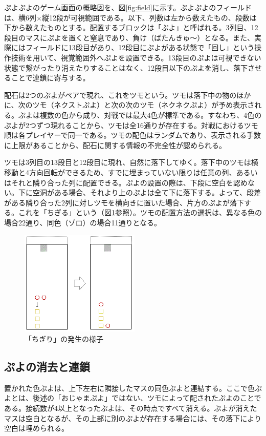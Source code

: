 \documentclass[12pt]{jsarticle}
\begin{document}
ぷよぷよのゲーム画面の概略図を、図\ref{fig:field}に示す。ぷよぷよのフィールドは、横6列$\times$縦12段が可視範囲である。以下、列数は左から数えたもの、段数は下から数えたものとする。配置するブロックは「ぷよ」と呼ばれる。3列目、12段目のマスにぷよを置くと窒息であり、負け（ばたんきゅ～）となる。また、実際にはフィールドに13段目があり、12段目にぷよがある状態で「回し」という操作技術を用いて、視覚範囲外へぷよを設置できる。13段目のぷよは可視できない状態で繋がったり消えたりすることはなく、12段目以下のぷよを消し、落下させることで連鎖に寄与する。

配石は2つのぷよがペアで現れ、これをツモという。ツモは落下中の物のほかに、次のツモ（ネクストぷよ）と次の次のツモ（ネクネクぷよ）が予め表示される。ぷよは複数の色から成り、対戦では最大4色が標準である。すなわち、4色のぷよが2つずつ現れることから、ツモは全16通りが存在する。対戦におけるツモ順は各プレイヤーで同一である。ツモの配色はランダムであり、表示される手数に上限があることから、配石に関する情報の不完全性が認められる。

ツモは3列目の13段目と12段目に現れ、自然に落下してゆく。落下中のツモは横移動と4方向回転ができるため、すでに埋まっていない限りは任意の列、あるいはそれと隣り合った列に配置できる。ぷよの設置の際は、下段に空白を認めない。下に空洞がある場合、それより上のぷよは全て下に落下する。よって、段差がある隣り合った2列に対しツモを横向きに置いた場合、片方のぷよが落下する。これを「ちぎる」という（図\ref{fig:tigiri}参照）。ツモの配置方法の選択は、異なる色の場合22通り、同色（ゾロ）の場合11通りとなる。
\begin{figure}[hbt]
  \begin{center}
  \includegraphics[height=5cm]{img/tigiri.png}
  \caption{「ちぎり」の発生の様子} \label{fig:tigiri}
\end{center}
\end{figure}

\subsection{ぷよの消去と連鎖} \label{del_chain}
置かれた色ぷよは、上下左右に隣接したマスの同色ぷよと連結する。ここで色ぷよとは、後述の「おじゃまぷよ」ではない、ツモによって配されたぷよのことである。接続数が4以上となったぷよは、その時点ですべて消える。ぷよが消えたマスは空白となるが、その上部に別のぷよが存在する場合には、その落下により空白は埋められる。
\end{document}
